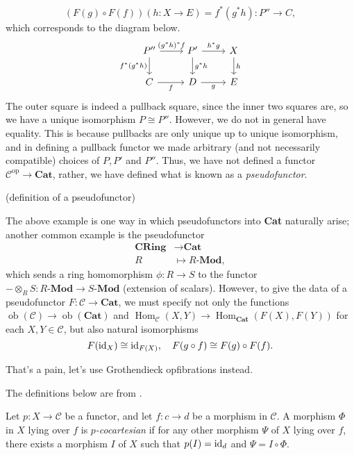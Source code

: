 \documentclass{MetricNotes2023}
\def\id{\ensuremath\text{id}}
\DeclareMathOperator{\Hom}{Hom}
\DeclareMathOperator{\ob}{ob}
\begin{document}
\[(F(g)\circ F(f))(h : X \to E)=f^*(g^*h) : P'' \to C,\] which corresponds to the diagram below.
\[\begin{tikzcd}
P'' \arrow[r, "(g^*h)^*f"] \arrow[d, swap, "f^*(g^*h)"]  & P' \arrow[r, "h^*g"] \arrow[d, "g^*h"] & X \arrow[d, "h"]  \\
C \arrow[r, swap, "f"]  & D \arrow[r, swap, "g"] & E
\end{tikzcd}\]
The outer square is indeed a pullback square, since the inner two squares are, so we have a unique isomorphism \(P \cong P''\). However, we do not in general have equality. This is because pullbacks are only unique up to unique isomorphism, and in defining a pullback functor we made arbitrary (and not necessarily compatible) choices of \(P, P'\) and \(P''\). Thus, we have not defined a functor \(\mathcal{C}^{\text{op}}\to \textbf{Cat}\), rather, we have defined what is known as a \textit{pseudofunctor}. 

(definition of a pseudofunctor)

The above example is one way in which pseudofunctors into \textbf{Cat} naturally arise; another common example is the pseudofunctor
\begin{align*}
\textbf{CRing}&\to \textbf{Cat}\\
R\; &\mapsto R \textbf{-Mod},
\end{align*}
which sends a ring homomorphism \(\phi : R \to S\) to the functor \(-\otimes_R S : R \textbf{-Mod}\to S \textbf{-Mod}\) (extension of scalars). However, to give the data of a pseudofunctor \(F : \mathcal{C} \to \textbf{Cat}\), we must specify not only the functions \(\ob(\mathcal{C})\to \ob(\textbf{Cat})\) and \(\Hom_\mathcal{C}(X, Y)\to \Hom_\textbf{Cat}(F(X), F(Y))\) for each \(X, Y \in \mathcal{C}\), but also natural isomorphisms
\[F(\id_X) \cong \id_{F(X)}, \quad F(g \circ f) \cong F(g) \circ F(f).\]

That's a pain, let's use Grothendieck opfibrations instead. 

The definitions below are from \autocite{goodfibrations}.

\begin{definition}
Let \(p : X \to \mathcal{C}\) be a functor, and let \(f : c \to d\) be a morphism in \(\mathcal{C}\). A morphism \(\Phi\) in \(X\) lying over \(f\) is \textit{\(p\)-cocartesian} if for any other morphism \(\Psi\) of \(X\) lying over \(f\), there exists a morphism \(I\) of \(X\) such that \(p(I)=\id_d\) and \(\Psi = I \circ \Phi\). 
\end{definition}
\end{document}
